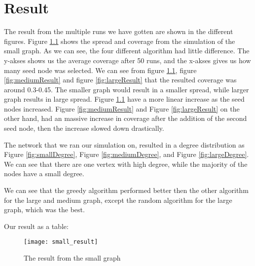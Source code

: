 \chapter{Result}\label{result}
The result from the multiple runs we have gotten are shown in the different figures. Figure \ref{fig:smallResult} shows the spread and coverage from the simulation of the small graph. As we can see, the four different algorithm had little difference. The y-akses shows us the average coverage after 50 runs, and the x-akses gives us how many seed node was selected. We can see from figure \ref{fig:smallResult}, figure \ref{fig:mediumResult} and figure \ref{fig:largeResult} that the resulted coverage was around 0.3-0.45. The smaller graph would result in a smaller spread, while larger graph results in large spread. Figure \ref{fig:smallResult} have a more linear increase as the seed nodes increased. Figure \ref{fig:mediumResult} and Figure \ref{fig:largeResult} on the other hand, had an massive increase in coverage after the addition of the second seed node, then the increase slowed down drastically. 

The network that we ran our simulation on, resulted in a degree distribution as Figure \ref{fig:smallDegree}, Figure \ref{fig:mediumDegree}, and Figure \ref{fig:largeDegree}. We can see that there are one vertex with high degree, while the majority of the nodes have a small degree. 


We can see that the greedy algorithm performed better then the other algorithm for the large and medium graph, except the random algorithm for the large graph, which was the best.


Our result as a table:

\begin{figure}[t]
	\texttt{[image: small\_result]}
	\caption{The result from the small graph} 
	\label{fig:smallResult}
\end{figure}

